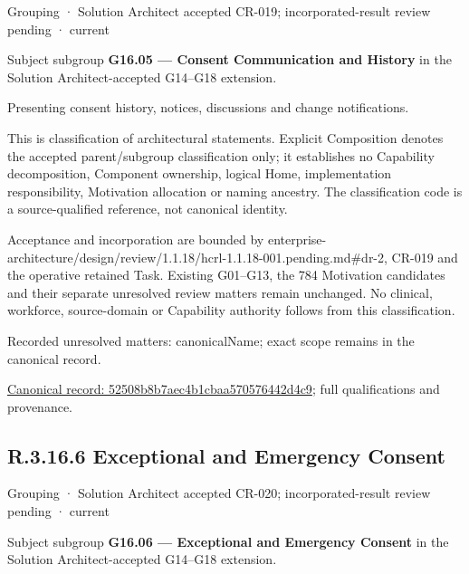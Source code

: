 \label{element:52508b8b7aec4b1cbaa570576442d4c9}
{\small Grouping · Solution Architect accepted CR-019; incorporated-result review pending · current}\par

Subject subgroup \textbf{G16.05 — Consent Communication and History} in the Solution Architect-accepted G14–G18 extension.



Presenting consent history, notices, discussions and change notifications.



This is classification of architectural statements. Explicit Composition denotes the accepted parent/subgroup classification only; it establishes no Capability decomposition, Component ownership, logical Home, implementation responsibility, Motivation allocation or naming ancestry. The classification code is a source-qualified reference, not canonical identity.



Acceptance and incorporation are bounded by enterprise-architecture/design/review/1.1.18/hcrl-1.1.18-001.pending.md\#dr-2, CR-019 and the operative retained Task. Existing G01–G13, the 784 Motivation candidates and their separate unresolved review matters remain unchanged. No clinical, workforce, source-domain or Capability authority follows from this classification.


{\small Recorded unresolved matters: canonicalName; exact scope remains in the canonical record.}\par
{\footnotesize \href{../../../../continuum/grouping/52508b8b7aec4b1cbaa570576442d4c9.md}{Canonical record: 52508b8b7aec4b1cbaa570576442d4c9}; full qualifications and provenance.}\par
\subsection*{R.3.16.6 Exceptional and Emergency Consent}
\label{navigation:R.3.16.6}

\label{element:25bc65e773d64ecf9b71ae4f92ed57e1}
{\small Grouping · Solution Architect accepted CR-020; incorporated-result review pending · current}\par

Subject subgroup \textbf{G16.06 — Exceptional and Emergency Consent} in the Solution Architect-accepted G14–G18 extension.



